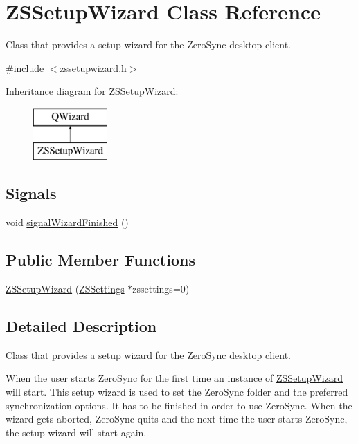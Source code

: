 \hypertarget{class_z_s_setup_wizard}{\section{Z\-S\-Setup\-Wizard Class Reference}
\label{class_z_s_setup_wizard}
}


Class that provides a setup wizard for the Zero\-Sync desktop client.  




{\ttfamily \#include $<$zssetupwizard.\-h$>$}

Inheritance diagram for Z\-S\-Setup\-Wizard\-:\begin{figure}[H]
\begin{center}
\leavevmode
\includegraphics[height=2.000000cm]{class_z_s_setup_wizard}
\end{center}
\end{figure}
\subsection*{Signals}
\begin{DoxyCompactItemize}
\item 
void \hyperlink{class_z_s_setup_wizard_a4d54068a3aa869295ed04ea1b9bd5418}{signal\-Wizard\-Finished} ()
\end{DoxyCompactItemize}
\subsection*{Public Member Functions}
\begin{DoxyCompactItemize}
\item 
\hyperlink{class_z_s_setup_wizard_af60830b02ff8993e0880516f87babb12}{Z\-S\-Setup\-Wizard} (\hyperlink{class_z_s_settings}{Z\-S\-Settings} $\ast$zssettings=0)
\end{DoxyCompactItemize}


\subsection{Detailed Description}
Class that provides a setup wizard for the Zero\-Sync desktop client. 

When the user starts Zero\-Sync for the first time an instance of \hyperlink{class_z_s_setup_wizard}{Z\-S\-Setup\-Wizard} will start. This setup wizard is used to set the Zero\-Sync folder and the preferred synchronization options. It has to be finished in order to use Zero\-Sync. When the wizard gets aborted, Zero\-Sync quits and the next time the user starts Zero\-Sync, the setup wizard will start again. 

